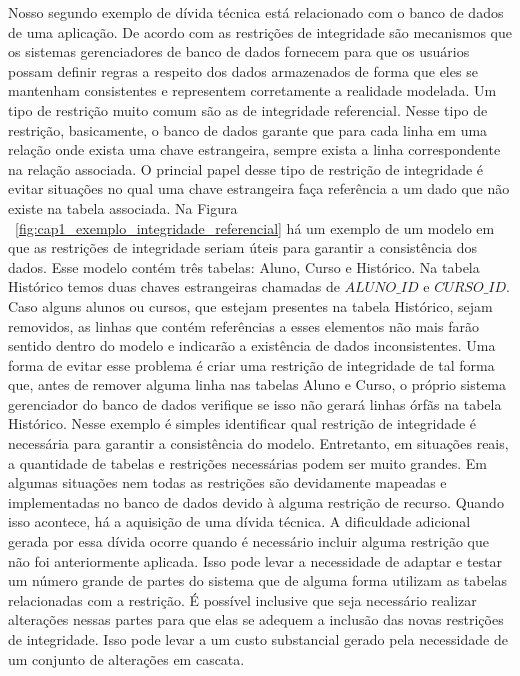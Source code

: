 
 Nosso segundo exemplo de dívida técnica está relacionado com o banco de dados de uma aplicação. De acordo com \cite{elmasri2016fundamentals} as restrições de integridade são mecanismos que os sistemas gerenciadores de banco de dados fornecem  para que os usuários possam definir regras a respeito dos dados armazenados de forma que eles se mantenham consistentes e representem corretamente a realidade modelada. Um tipo de restrição muito comum são as de integridade referencial. Nesse tipo de restrição, basicamente, o banco de dados garante que para cada linha em uma relação onde exista uma chave estrangeira, sempre exista a linha correspondente na relação associada. O princial papel desse tipo de restrição de integridade é evitar situações no qual uma chave estrangeira faça referência a um dado que não existe na tabela associada. Na Figura ~\ref{fig:cap1_exemplo_integridade_referencial} há um exemplo de um modelo em que as restrições de integridade seriam úteis para garantir a consistência dos dados. Esse modelo contém três tabelas: Aluno, Curso e Histórico. Na tabela Histórico temos duas chaves estrangeiras chamadas de $ALUNO\_ID$ e $CURSO\_ID$. Caso alguns alunos ou cursos, que estejam presentes na tabela Histórico, sejam removidos, as linhas que contém referências a esses elementos não mais farão sentido dentro do modelo e indicarão a existência de dados inconsistentes. Uma forma de evitar esse problema é criar uma restrição de integridade de tal forma que, antes de remover alguma linha nas tabelas Aluno e Curso, o próprio sistema gerenciador do banco de dados verifique se isso não gerará linhas órfãs na tabela Histórico. Nesse exemplo é simples identificar qual restrição de integridade é necessária para garantir a consistência do modelo. Entretanto, em situações reais, a quantidade de tabelas e restrições necessárias podem ser muito grandes. Em algumas situações nem todas as restrições são devidamente mapeadas e implementadas no banco de dados devido à alguma restrição de recurso. Quando isso acontece, há a aquisição de uma dívida técnica. A dificuldade adicional gerada por essa dívida ocorre quando é necessário incluir alguma restrição que não foi anteriormente aplicada. Isso pode levar a necessidade de adaptar e testar um número grande de partes do sistema que de alguma forma utilizam as tabelas relacionadas com a restrição. É possível inclusive que seja necessário realizar alterações nessas partes para que elas se adequem a inclusão das novas restrições de integridade. Isso pode levar a um custo substancial gerado pela necessidade de um conjunto de alterações em cascata. 
 
